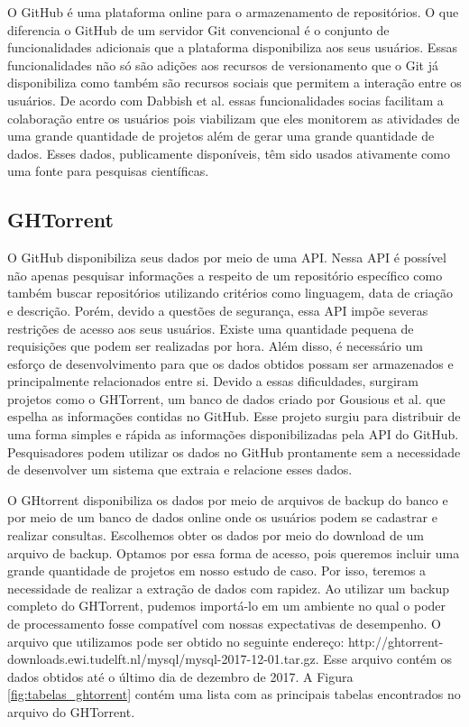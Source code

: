 O GitHub é uma plataforma online para o armazenamento de repositórios. O que diferencia o GitHub de um servidor Git convencional é o conjunto de funcionalidades adicionais que a plataforma disponibiliza aos seus usuários. Essas funcionalidades não só são adições aos recursos de versionamento que o Git já disponibiliza como também são recursos sociais que permitem a interação entre os usuários. De acordo com  Dabbish et al. \cite{dabbish2012social} essas funcionalidades socias facilitam a colaboração entre os usuários pois viabilizam que eles monitorem as atividades de uma grande quantidade de projetos além de gerar uma grande quantidade de dados. Esses dados, publicamente disponíveis,  têm sido usados ativamente como uma fonte para pesquisas científicas. 






\subsection{GHTorrent}

O GitHub disponibiliza seus dados por meio de uma API. Nessa API é possível não apenas pesquisar informações a respeito de um repositório específico como também buscar repositórios utilizando critérios como linguagem, data de criação e descrição. Porém, devido a questões de segurança, essa API impõe severas restrições de acesso aos seus usuários.  Existe uma quantidade pequena de requisições que podem ser realizadas por hora. Além disso, é necessário um esforço de desenvolvimento para que os dados obtidos possam ser armazenados e principalmente relacionados entre si. Devido a essas dificuldades, surgiram projetos como o GHTorrent, um banco de dados  criado por Gousious et al. \cite{gousios2012ghtorrent} que espelha as informações contidas no GitHub. Esse projeto surgiu para distribuir de uma forma simples e rápida as informações disponibilizadas pela API do GitHub. Pesquisadores podem utilizar os dados no GitHub prontamente sem a necessidade de desenvolver um sistema que extraia e relacione esses dados.

O GHtorrent disponibiliza os dados por meio de arquivos de backup do banco e por meio de um banco de dados online onde os usuários podem se cadastrar e realizar consultas. Escolhemos obter os dados por meio do download de um arquivo de backup. Optamos por essa forma de acesso, pois queremos incluir uma grande quantidade de projetos em nosso estudo de caso. Por isso, teremos a necessidade de realizar a extração de dados com rapidez. Ao utilizar um backup completo do GHTorrent, pudemos importá-lo em um ambiente no qual o poder de processamento fosse compatível com nossas expectativas de desempenho.  O arquivo que utilizamos pode ser obtido no seguinte endereço: http://ghtorrent-downloads.ewi.tudelft.nl/mysql/mysql-2017-12-01.tar.gz. Esse arquivo contém os dados obtidos até o último dia de dezembro de 2017. A Figura \ref{fig:tabelas_ghtorrent} contém uma lista com as  principais tabelas encontrados no arquivo do GHTorrent.


